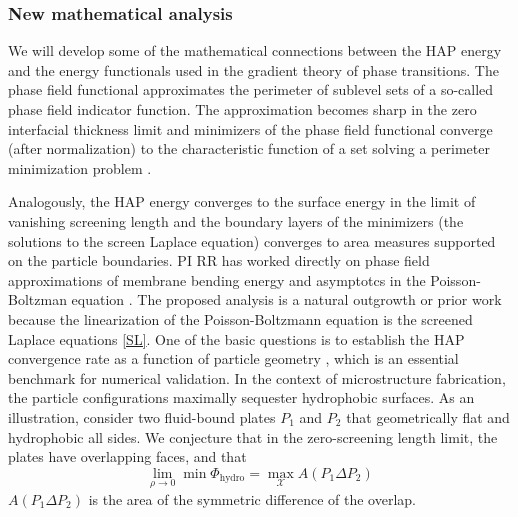 
\subsubsection{New mathematical analysis}

We will develop some of the mathematical connections between the HAP energy and the energy functionals used in the gradient theory of phase transitions. 
The phase field functional approximates the perimeter of sublevel sets of a so-called phase field indicator function. 
The approximation becomes sharp in the zero interfacial thickness limit and minimizers of the phase field functional converge (after normalization) 
to the characteristic function of a set solving a perimeter minimization problem 
\cite{Modica87, MODICA1987487, LuMo89}. 

Analogously, the HAP energy converges to the surface energy in the limit of vanishing screening length 
and the boundary layers of the minimizers (the solutions to the screen Laplace equation) converges to 
area measures supported on the particle boundaries. 
PI RR has worked directly on phase field approximations of membrane bending energy 
\cite{0951-7715-18-3-016} and asymptotcs in the Poisson-Boltzman equation \cite{1531-3492_2006_2_357,Lee2018}.
The proposed analysis is a natural outgrowth or prior work because the linearization of the Poisson-Boltzmann equation is the screened Laplace equations \eqref{SL}.
One of the basic questions is to establish the HAP convergence rate as a function of particle geometry 
\cite{LuMo89}, which is an essential benchmark for numerical validation. 
In the context of microstructure fabrication, the particle configurations maximally sequester hydrophobic surfaces.  
As an illustration, consider two fluid-bound plates $P_1$ and $P_2$ that geometrically flat and hydrophobic all sides.
We conjecture that in the zero-screening length limit, the plates have overlapping faces, and that 
\begin{equation}
\lim_{\rho \to 0} \min \Phi_{\text{hydro}} = \max_{\mathcal{X}} A(P_1 \Delta P_2)
\end{equation}
$A(P_1 \Delta P_2)$ is the area of the symmetric difference of the overlap.  
\cite{https://doi.org/10.1038/s41467-019-09787-6}


